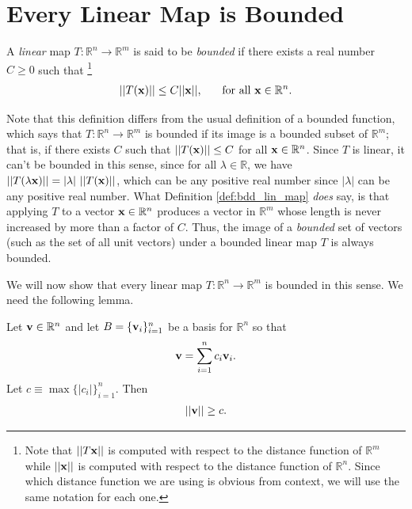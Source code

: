 \documentclass[12pt,letterpaper,reqno]{article}
\numberwithin{equation}{section}
\newcommand{\R}{\ensuremath{\mathbb R}}
\newcommand{\bv}{{\bf v}}
\newcommand{\bx}{{\bf x}}
\begin{document}
{\section{Every Linear Map is Bounded}
\begin{defn}\label{def:bdd_lin_map}
	A \emph{linear} map $T:\R^n \to \R^m$ is said to be \emph{bounded} if there exists a real number $C\geq 0$ such that \footnote{Note that $||T\bx||$ is computed with respect to the distance function of $\R^m$ while $||\bx||$ is computed with respect to the distance function of $\R^n$. Since which distance function we are using is obvious from context, we will use the same notation for each one.} 
	\begin{align}\label{eq:bounded_op}
		||T(\bx)||\leq C||\bx||, \hspace{0.5cm} \text{ for all } \bx \in \R^n. 
	\end{align}
\end{defn}

Note that this definition differs from the usual definition of a bounded function, which says that $T:\R^n \to \R^m$ is bounded if its image is a bounded subset of $\R^m$; that is, if there exists $C$ such that $||T(\bx)||\leq C$ for all $\bx \in \R^n$. Since $T$ is linear, it can't be bounded in this sense, since for all $\lambda \in \R$, we have $||T(\lambda \bx)||=|\lambda| \ ||T(\bx)||$, which can be any positive real number since $|\lambda|$ can be any positive real number. What Definition \ref{def:bdd_lin_map} \emph{does} say, is that applying $T$ to a vector $\bx \in \R^n$ produces a vector in $\R^m$ whose length is never increased by more than a factor of $C$. Thus, the image of a \emph{bounded} set  of vectors (such as the set of all unit vectors) under a bounded linear map $T$ is always bounded.



We will now show that every linear map $T:\R^n \to \R^m$ is bounded in this sense. We need the following lemma.

\begin{lem}\label{eq:inequality_we_need}
Let $\bv \in \R^n$ and let $B=\{\bv_i\}_{i=1}^n$ be a basis for $\R^n$ so that
\begin{align*}
	\bv=\sum_{i=1}^nc_i\bv_i.
\end{align*}
Let $c\equiv \max\{|c_i|\}_{i=1}^n$. Then
\begin{align*}
	||\bv||\geq c.
\end{align*}
\end{lem}

}
\end{document}
